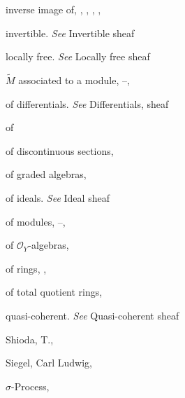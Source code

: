 {{\noindent\hspace*{7.5bp}inverse image of, , , , , \par
\noindent\hspace*{7.5bp}invertible. \emph{See} Invertible sheaf\par
\noindent\hspace*{7.5bp}locally free. \emph{See} Locally free sheaf\par
\noindent\hspace*{7.5bp}$\widetilde M$ associated to a module, --, \par
\noindent\hspace*{7.5bp}of differentials. \emph{See} Differentials, sheaf\par
\noindent\hspace*{15.0bp}of\par
\noindent\hspace*{7.5bp}of discontinuous sections, \par
\noindent\hspace*{7.5bp}of graded algebras, \par
\noindent\hspace*{7.5bp}of ideals. \emph{See} Ideal sheaf\par
\noindent\hspace*{7.5bp}of modules, --, \par
\noindent\hspace*{7.5bp}of $\mathcal O_Y$-algebras, \par
\noindent\hspace*{7.5bp}of rings, , \par
\noindent\hspace*{7.5bp}of total quotient rings, \par
\noindent\hspace*{7.5bp}quasi-coherent. \emph{See} Quasi-coherent sheaf\par
\noindent\hspace*{0.0bp}Shioda, T., \par
\noindent\hspace*{0.0bp}Siegel, Carl Ludwig, \par
\noindent\hspace*{0.0bp}$\sigma$-Process, \par
}}
